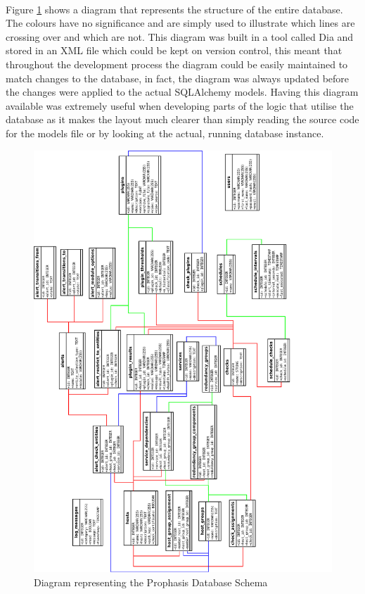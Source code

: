\documentclass[bsc,logo,twoside,singlespacing]{infthesis}
\begin{document}
\paragraph*{}
	Figure \ref{database-diagram} shows a diagram that represents the structure
	of the entire database.  The colours have no significance and are simply used
	to illustrate which lines are crossing over and which are not.
	This diagram was built in a tool called Dia and stored
	in an XML file which could be kept on version control, this meant that
	throughout the development process the diagram could be easily maintained to
	match changes to the database, in fact, the diagram was always updated before
	the changes were applied to the actual SQLAlchemy models. Having this diagram
	available was extremely useful when developing parts of the logic that utilise
	the database as it makes the layout much clearer than simply reading the source
	code for the models file or by looking at the actual, running database
	instance.
	
\begin{figure}[H]
	\caption{Diagram representing the Prophasis Database Schema}
	\label{database-diagram}
	\includegraphics[scale=0.84]{assets/schema.pdf}
\end{figure}
\end{document}
